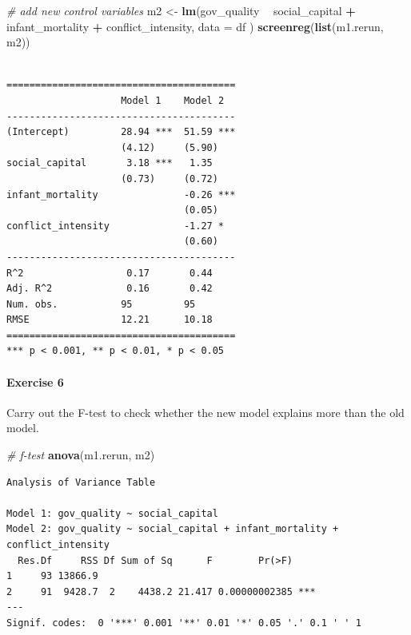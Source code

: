 \documentclass[]{article}
\newenvironment{Shaded}{\begin{snugshade}}{\end{snugshade}}
\newcommand{\KeywordTok}[1]{\textcolor[rgb]{0.13,0.29,0.53}{\textbf{#1}}}
\newcommand{\DataTypeTok}[1]{\textcolor[rgb]{0.13,0.29,0.53}{#1}}
\newcommand{\StringTok}[1]{\textcolor[rgb]{0.31,0.60,0.02}{#1}}
\newcommand{\CommentTok}[1]{\textcolor[rgb]{0.56,0.35,0.01}{\textit{#1}}}
\newcommand{\OperatorTok}[1]{\textcolor[rgb]{0.81,0.36,0.00}{\textbf{#1}}}
\newcommand{\NormalTok}[1]{#1}
\let\oldparagraph\paragraph
\renewcommand{\paragraph}[1]{\oldparagraph{#1}\mbox{}}
\theoremstyle{definition}
\theoremstyle{definition}
\theoremstyle{definition}
\theoremstyle{remark}
\begin{document}
\begin{Shaded}
\begin{Highlighting}[]
\CommentTok{# add new control variables}
\NormalTok{m2 <-}\StringTok{ }\KeywordTok{lm}\NormalTok{(gov_quality }\OperatorTok{~}\StringTok{ }\NormalTok{social_capital }\OperatorTok{+}\StringTok{ }\NormalTok{infant_mortality }\OperatorTok{+}\StringTok{ }\NormalTok{conflict_intensity, }\DataTypeTok{data =}\NormalTok{ df )}
\KeywordTok{screenreg}\NormalTok{(}\KeywordTok{list}\NormalTok{(m1.rerun, m2))}
\end{Highlighting}
\end{Shaded}

\begin{verbatim}

========================================
                    Model 1    Model 2  
----------------------------------------
(Intercept)         28.94 ***  51.59 ***
                    (4.12)     (5.90)   
social_capital       3.18 ***   1.35    
                    (0.73)     (0.72)   
infant_mortality               -0.26 ***
                               (0.05)   
conflict_intensity             -1.27 *  
                               (0.60)   
----------------------------------------
R^2                  0.17       0.44    
Adj. R^2             0.16       0.42    
Num. obs.           95         95       
RMSE                12.21      10.18    
========================================
*** p < 0.001, ** p < 0.01, * p < 0.05
\end{verbatim}

\paragraph{Exercise 6}\label{exercise-6-6}

Carry out the F-test to check whether the new model explains more than
the old model.

\begin{Shaded}
\begin{Highlighting}[]
\CommentTok{# f-test}
\KeywordTok{anova}\NormalTok{(m1.rerun, m2) }
\end{Highlighting}
\end{Shaded}

\begin{verbatim}
Analysis of Variance Table

Model 1: gov_quality ~ social_capital
Model 2: gov_quality ~ social_capital + infant_mortality + conflict_intensity
  Res.Df     RSS Df Sum of Sq      F        Pr(>F)    
1     93 13866.9                                      
2     91  9428.7  2    4438.2 21.417 0.00000002385 ***
---
Signif. codes:  0 '***' 0.001 '**' 0.01 '*' 0.05 '.' 0.1 ' ' 1
\end{verbatim}
\end{document}
